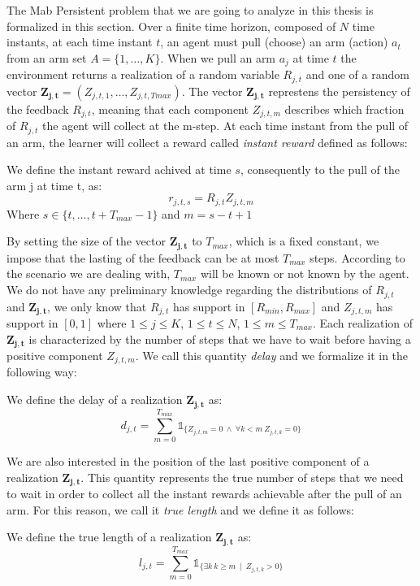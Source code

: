 The Mab Persistent problem that we are going to analyze in this thesis is formalized in this section. Over a finite time horizon, composed of $N$ time instants, at each time instant $t$, an agent must pull (choose) an arm (action) $a_t$ from an arm set $A =\{1, \dots, K\} $. When we pull an arm $a_j$ at time $t$ the environment returns a realization of a random variable $R_{j,t}$ and one of a random vector $\boldsymbol{Z_{j,t}}= (Z_{j,t,1},\dots, Z_{j,t,Tmax})$. The vector $\boldsymbol{Z_{j,t}}$ represtens the persistency of the feedback $R_{j,t}$, meaning that each component $Z_{j,t,m}$ describes which fraction of $R_{j,t}$ the agent will collect at the m-step. At each time instant from the pull of an arm, the learner will collect a reward called \emph{instant reward} defined as follows:
\begin{definition}
	We define the instant reward achived at time $s$, consequently to the pull of the arm j at time t, as:	
		$$r_{j,t,s} = R_{j,t} Z_{j,t,m}$$
Where $s \in \{t,\dots,t+T_{max}-1\}$ and $m = s-t+1$
\end{definition}
By setting the size of the vector $\boldsymbol{Z_{j,t}}$ to $T_{max}$, which is a fixed constant, we impose that the lasting of the feedback can be at most $T_{max}$ steps. According to the scenario we are dealing with, $T_{max}$ will be known or not known by the agent. We do not have any preliminary knowledge regarding the distributions of $R_{j,t}$ and $\boldsymbol{Z_{j,t}}$, we only know that $R_{j,t}$ has support in $[R_{min},R_{max}]$ and $Z_{j,t,m}$ has support in $[0,1]$ where $1\leq j \leq K$, $1\leq t \leq N$, $1\leq m \leq T_{max}$. Each realization of $\boldsymbol{Z_{j,t}}$ is characterized by the number of steps that we have to wait before having a positive component $Z_{j,t,m}$. We call this quantity \emph{delay} and we formalize it in the following way:
\begin{definition}[Delay]
	We define the delay of a realization $\boldsymbol{Z_{j,t}}$ as:$$d_{j,t} = \sum_{m=0}^{T_{max}}\mathds{1}_{\{Z_{j,t,m}=0\ \wedge\ \forall k<m\ Z_{j,t,k} = 0\}}$$

\end{definition}
We are also interested in the position of the last positive component of a realization $\boldsymbol{Z_{j,t}}$. This quantity represents the true number of steps that we need to wait in order to collect all the instant rewards achievable after the pull of an arm. For this reason, we call it \emph{true length} and we define it as follows:
\begin{definition}
	We define the true length of a realization $\boldsymbol{Z_{j,t}}$ as:
		$$l_{j,t} = \sum_{m=0}^{T_{max}}\mathds{1}_{\{\exists k \ k\geq m \ \mid \ Z_{j,t,k} > 0\}}$$
\end{definition}




